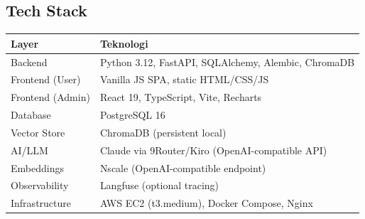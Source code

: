 \documentclass[11pt,a4paper]{article}
\begin{document}
\subsection{Tech Stack}
\begin{tabularx}{\linewidth}{@{}p{3.5cm}X@{}}
\toprule \textbf{Layer} & \textbf{Teknologi} \\ \midrule
Backend & Python 3.12, FastAPI, SQLAlchemy, Alembic, ChromaDB \\
Frontend (User) & Vanilla JS SPA, static HTML/CSS/JS \\
Frontend (Admin) & React 19, TypeScript, Vite, Recharts \\
Database & PostgreSQL 16 \\
Vector Store & ChromaDB (persistent local) \\
AI/LLM & Claude via 9Router/Kiro (OpenAI-compatible API) \\
Embeddings & Nscale (OpenAI-compatible endpoint) \\
Observability & Langfuse (optional tracing) \\
Infrastructure & AWS EC2 (t3.medium), Docker Compose, Nginx \\
\bottomrule
\end{tabularx}

\newpage
\end{document}
